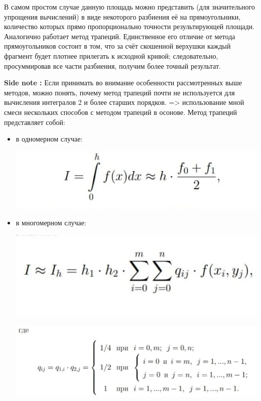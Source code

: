 \documentclass{report}
\begin{document}
\par В самом простом случае данную площадь можно представить (для значительного упрощения вычислений) в виде некоторого разбиения её на прямоугольники, количество которых прямо пропорционально точности результирующей площади.
Аналогично работает метод трапеций. Единственное его отличие от метода прямоугольников состоит в том, что за счёт скошенной верхушки каждый фрагмент будет плотнее прилегать к исходной кривой; следовательно, просуммировав все части разбиения, получим более точный результат.

\textbf{Side note : }  Если принимать во внимание особенности рассмотренных выше методов, можно понять, почему метод трапеций почти не используется для вычисления интегралов 2 и более старших порядков. => использование мной смеси нескольких способов с методом трапеций в осонове.
Метод трапеций представляет собой:
\begin{itemize}
\item в одномерном случае:
\begin{center}
\includegraphics[scale=0.8]{bur_img/onedim.jpg}
\end{center}
\item в многомерном случае:
\begin{center}
\includegraphics[scale=0.8]{bur_img/multidim.jpg}
\end{center}
\begin{center}
\includegraphics[scale=0.6]{bur_img/system.jpg}
\end{center}
\end{itemize}
\newpage
\end{document}
